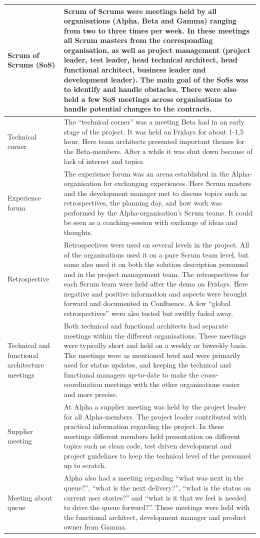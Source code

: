 \begin{center}
\begin{longtable}{| p{6cm} | p{9cm} |}
    Scrum of Scrums (SoS) & Scrum of Scrums were meetings held by all organisations (Alpha, Beta and Gamma) ranging from two to three times per week. In these meetings all Scrum masters from the corresponding organisation, as well as project management (project leader, test leader, head technical architect, head functional architect, business leader and development leader). The main goal of the SoSs was to identify and handle obstacles. There were also held a few SoS meetings across organisations to handle potential changes to the contracts. \\ \hline
    Technical corner & The ``technical corner'' was a meeting Beta had in an early stage of the project. It was held on Fridays for about 1-1,5 hour. Here team architects presented important themes for the Beta-members. After a while it was shut down because of lack of interest and topics. \\ \hline
    Experience forum & The experience forum was an arena established in the Alpha-organisation for exchanging experiences. Here Scrum masters and the development manager met to discuss topics such as retrospectives, the planning day, and how work was performed by the Alpha-organisation's Scrum teams. It could be seen as a coaching-session with exchange of ideas and thoughts. \\ \hline
    Retrospective & Retrospectives were used on several levels in the project. All of the organisations used it on a pure Scrum team level, but some also used it on both the solution description personnel and in the project management team. The retrospectives for each Scrum team were held after the demo on Fridays. Here negative and positive information and aspects were brought forward and documented in Confluence. A few ``global retrospectives'' were also tested but swiftly faded away. \\ \hline
    Technical and functional architecture meetings & Both technical and functional architects had separate meetings within the different organisations. These meetings were typically short and held on a weekly or biweekly basis. The meetings were as mentioned brief and were primarily used for status updates, and keeping the technical and functional managers up-to-date to make the cross-coordination meetings with the other organisations easier and more precise. \\ \hline
    Supplier meeting & At Alpha a supplier meeting was held by the project leader for all Alpha-members. The project leader contributed with practical information regarding the project. In these meetings different members held presentation on different topics such as clean code, test driven development and project guidelines to keep the technical level of the personnel up to scratch. \\ \hline
    Meeting about queue & Alpha also had a meeting regarding ``what was next in the queue?'', ``what is the next delivery?'', ``what is the status on current user stories?'' and ``what is it that we feel is needed to drive the queue forward?''. These meetings were held with the functional architect, development manager and product owner from Gamma. \\ \hline


\end{longtable}
\end{center}
